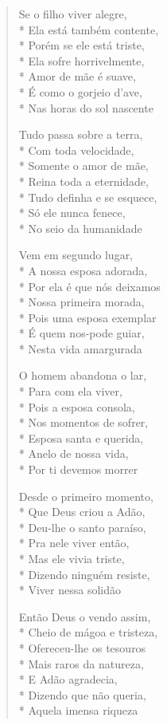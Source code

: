 \begin{verse}
Se o filho viver alegre,\\*
Ela está também contente,\\*
Porém se ele está triste,\\*
Ela sofre horrivelmente,\\*
Amor de mãe é suave,\\*
É como o gorjeio d'ave,\\*
Nas horas do sol nascente

Tudo passa sobre a terra,\\*
Com toda velocidade,\\*
Somente o amor de mãe,\\*
Reina toda a eternidade,\\*
Tudo definha e se esquece,\\*
Só ele nunca fenece,\\*
No seio da humanidade

Vem em segundo lugar,\\*
A nossa esposa adorada,\\*
Por ela é que nós deixamos\\*
Nossa primeira morada,\\*
Pois uma esposa exemplar\\*
É quem nos-pode guiar,\\*
Nesta vida amargurada

O homem abandona o lar,\\*
Para com ela viver,\\*
Pois a esposa consola,\\*
Nos momentos de sofrer,\\*
Esposa santa e querida,\\*
Anelo de nossa vida,\\*
Por ti devemos morrer

Desde o primeiro momento,\\*
Que Deus criou a Adão,\\*
Deu-lhe o santo paraíso,\\*
Pra nele viver então,\\*
Mas ele vivia triste,\\*
Dizendo ninguém resiste,\\*
Viver nessa solidão

Então Deus o vendo assim,\\*
Cheio de mágoa e tristeza,\\*
Ofereceu-lhe os tesouros\\*
Mais raros da natureza,\\*
E Adão agradecia,\\*
Dizendo que não queria,\\*
Aquela imensa riqueza


\end{verse}
